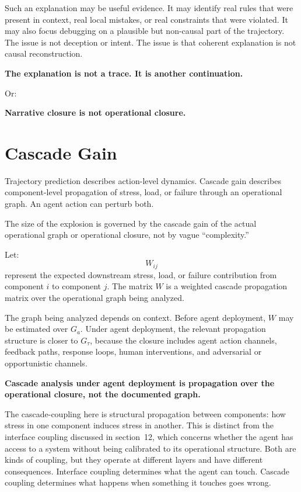 \documentclass[11pt]{article}
\begin{document}
Such an explanation may be useful evidence. It may identify real rules that were present in context, real local mistakes, or real constraints that were violated. It may also focus debugging on a plausible but non-causal part of the trajectory. The issue is not deception or intent. The issue is that coherent explanation is not causal reconstruction.

\begin{pullquote}
\textbf{The explanation is not a trace. It is another continuation.}
\end{pullquote}

Or:

\begin{pullquote}
\textbf{Narrative closure is not operational closure.}
\end{pullquote}

\section{Cascade Gain}

Trajectory prediction describes action-level dynamics. Cascade gain describes component-level propagation of stress, load, or failure through an operational graph. An agent action can perturb both.

The size of the explosion is governed by the cascade gain of the actual operational graph or operational closure, not by vague ``complexity.''

Let:
\[
W_{ij}
\]
represent the expected downstream stress, load, or failure contribution from component $i$ to component $j$. The matrix $W$ is a weighted cascade propagation matrix over the operational graph being analyzed.

The graph being analyzed depends on context. Before agent deployment, $W$ may be estimated over $G_a$. Under agent deployment, the relevant propagation structure is closer to $G_\tau$, because the closure includes agent action channels, feedback paths, response loops, human interventions, and adversarial or opportunistic channels.

\begin{pullquote}
\textbf{Cascade analysis under agent deployment is propagation over the operational closure, not the documented graph.}
\end{pullquote}

The cascade-coupling here is structural propagation between components: how stress in one component induces stress in another. This is distinct from the interface coupling discussed in section~12, which concerns whether the agent has access to a system without being calibrated to its operational structure. Both are kinds of coupling, but they operate at different layers and have different consequences. Interface coupling determines what the agent can touch. Cascade coupling determines what happens when something it touches goes wrong.
\end{document}
